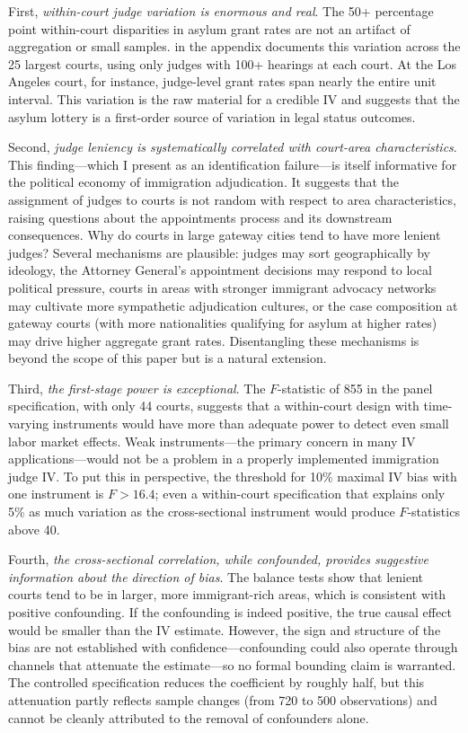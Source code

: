 \documentclass[12pt]{article}
\begin{document}
First, \textit{within-court judge variation is enormous and real}. The 50+ percentage point within-court disparities in asylum grant rates are not an artifact of aggregation or small samples.  in the appendix documents this variation across the 25 largest courts, using only judges with 100+ hearings at each court. At the Los Angeles court, for instance, judge-level grant rates span nearly the entire unit interval. This variation is the raw material for a credible IV and suggests that the asylum lottery is a first-order source of variation in legal status outcomes.

Second, \textit{judge leniency is systematically correlated with court-area characteristics}. This finding---which I present as an identification failure---is itself informative for the political economy of immigration adjudication. It suggests that the assignment of judges to courts is not random with respect to area characteristics, raising questions about the appointments process and its downstream consequences. Why do courts in large gateway cities tend to have more lenient judges? Several mechanisms are plausible: judges may sort geographically by ideology, the Attorney General's appointment decisions may respond to local political pressure, courts in areas with stronger immigrant advocacy networks may cultivate more sympathetic adjudication cultures, or the case composition at gateway courts (with more nationalities qualifying for asylum at higher rates) may drive higher aggregate grant rates. Disentangling these mechanisms is beyond the scope of this paper but is a natural extension.

Third, \textit{the first-stage power is exceptional}. The $F$-statistic of 855 in the panel specification, with only 44 courts, suggests that a within-court design with time-varying instruments would have more than adequate power to detect even small labor market effects. Weak instruments---the primary concern in many IV applications---would not be a problem in a properly implemented immigration judge IV. To put this in perspective, the \citet{stock2005testing} threshold for 10\% maximal IV bias with one instrument is $F > 16.4$; even a within-court specification that explains only 5\% as much variation as the cross-sectional instrument would produce $F$-statistics above 40.

Fourth, \textit{the cross-sectional correlation, while confounded, provides suggestive information about the direction of bias}. The balance tests show that lenient courts tend to be in larger, more immigrant-rich areas, which is consistent with positive confounding. If the confounding is indeed positive, the true causal effect would be smaller than the IV estimate. However, the sign and structure of the bias are not established with confidence---confounding could also operate through channels that attenuate the estimate---so no formal bounding claim is warranted. The controlled specification reduces the coefficient by roughly half, but this attenuation partly reflects sample changes (from 720 to 500 observations) and cannot be cleanly attributed to the removal of confounders alone.
\end{document}
